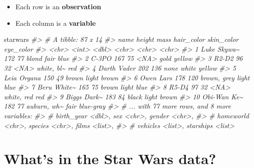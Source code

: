 \documentclass[
]{book}
\newenvironment{Shaded}{\begin{snugshade}}{\end{snugshade}}
\newcommand{\CommentTok}[1]{\textcolor[rgb]{0.56,0.35,0.01}{\textit{#1}}}
\newcommand{\NormalTok}[1]{#1}
\providecommand{\tightlist}{%
  \setlength{\itemsep}{0pt}\setlength{\parskip}{0pt}}
\theoremstyle{definition}
\theoremstyle{definition}
\theoremstyle{definition}
\theoremstyle{definition}
\theoremstyle{remark}
\begin{document}
\begin{itemize}
\tightlist
\item
  Each row is an \textbf{observation}
\item
  Each column is a \textbf{variable}
\end{itemize}

\begin{Shaded}
\begin{Highlighting}[]
\NormalTok{starwars}
\CommentTok{\#\textgreater{} \# A tibble: 87 x 14}
\CommentTok{\#\textgreater{}    name        height  mass hair\_color  skin\_color eye\_color}
\CommentTok{\#\textgreater{}    \textless{}chr\textgreater{}        \textless{}int\textgreater{} \textless{}dbl\textgreater{} \textless{}chr\textgreater{}       \textless{}chr\textgreater{}      \textless{}chr\textgreater{}    }
\CommentTok{\#\textgreater{}  1 Luke Skywa\textasciitilde{}    172    77 blond       fair       blue     }
\CommentTok{\#\textgreater{}  2 C{-}3PO          167    75 \textless{}NA\textgreater{}        gold       yellow   }
\CommentTok{\#\textgreater{}  3 R2{-}D2           96    32 \textless{}NA\textgreater{}        white, bl\textasciitilde{} red      }
\CommentTok{\#\textgreater{}  4 Darth Vader    202   136 none        white      yellow   }
\CommentTok{\#\textgreater{}  5 Leia Organa    150    49 brown       light      brown    }
\CommentTok{\#\textgreater{}  6 Owen Lars      178   120 brown, grey light      blue     }
\CommentTok{\#\textgreater{}  7 Beru White\textasciitilde{}    165    75 brown       light      blue     }
\CommentTok{\#\textgreater{}  8 R5{-}D4           97    32 \textless{}NA\textgreater{}        white, red red      }
\CommentTok{\#\textgreater{}  9 Biggs Dark\textasciitilde{}    183    84 black       light      brown    }
\CommentTok{\#\textgreater{} 10 Obi{-}Wan Ke\textasciitilde{}    182    77 auburn, wh\textasciitilde{} fair       blue{-}gray}
\CommentTok{\#\textgreater{} \# ... with 77 more rows, and 8 more variables:}
\CommentTok{\#\textgreater{} \#   birth\_year \textless{}dbl\textgreater{}, sex \textless{}chr\textgreater{}, gender \textless{}chr\textgreater{},}
\CommentTok{\#\textgreater{} \#   homeworld \textless{}chr\textgreater{}, species \textless{}chr\textgreater{}, films \textless{}list\textgreater{},}
\CommentTok{\#\textgreater{} \#   vehicles \textless{}list\textgreater{}, starships \textless{}list\textgreater{}}
\end{Highlighting}
\end{Shaded}

\hypertarget{whats-in-the-star-wars-data}{%
\section{What's in the Star Wars data?}\label{whats-in-the-star-wars-data}}
\end{document}
